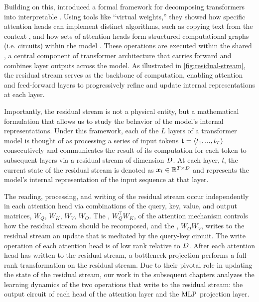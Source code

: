Building on this, \citet{elhage2021mathematical} introduced a formal framework for decomposing transformers into interpretable . Using tools like “virtual weights,” they showed how specific attention heads can implement distinct algorithms, such as copying text from the context \citep{olsson2022inductionheads}, and how sets of attention heads form structured computational graphs (i.e. circuits) within the model \citep{ameisen2025circuit}. These operations are executed within the shared , a central component of transformer architecture that carries forward and combines layer outputs across the model. As illustrated in \cref{fig:residual-stream}, the residual stream serves as the backbone of computation, enabling attention and feed-forward layers to progressively refine and update internal representations at each layer. 
 
Importantly, the residual stream is not a physical entity, but a mathematical formulation that allows us to study the behavior of the model's internal representations. Under this framework, each of the $L$ layers of a transformer model is thought of as processing a series of input tokens $\boldsymbol{\mathrm{t}} = \langle t_1, ..., t_T\rangle$ consecutively and communicates the result of its computation for each token to subsequent layers via a residual stream of dimension $D$. At each layer, $l$, the current state of the residual stream is denoted as $\boldsymbol{x}_l \in \mathbb{R}^{T \times D}$ and represents the model's internal representation of the input sequence at that layer.

The reading, processing, and writing of the residual stream occur independently in each attention head via combinations of the query, key, value, and output matrices, $W_Q$, $W_K$, $W_V$, $W_O$. The , $W_Q^{\top}W_K$, of the attention mechanism controls how the residual stream should be recomposed, and the , $W_OW_V$, writes to the residual stream an update that is mediated by the query-key circuit. The write operation of each attention head is of low rank relative to $D$. After each attention head has written to the residual stream, a bottleneck  projection performs a full-rank transformation on the residual stream. Due to their pivotal role in updating the state of the residual stream, our work in the subsequent chapters analyzes the learning dynamics of the two operations that write to the residual stream: the output circuit of each head of the attention layer and the $\mathrm{MLP}$ projection layer.

